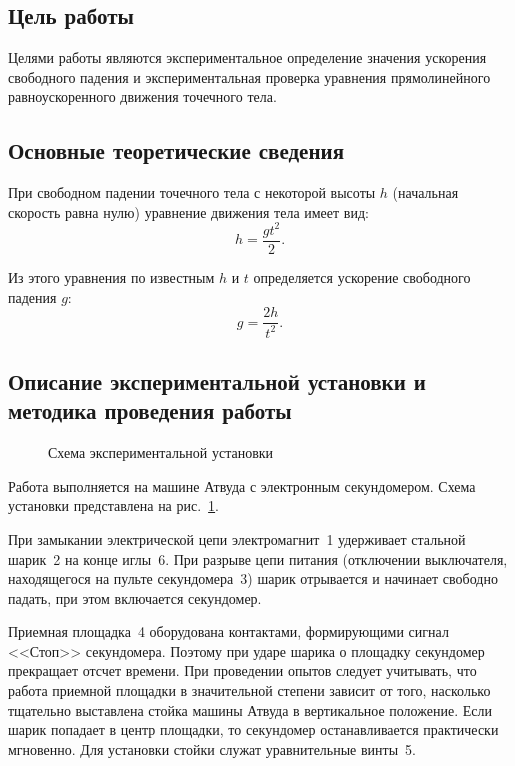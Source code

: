 \documentclass[a4paper, 12pt]{extarticle}
\begin{document}
\MTDTitlePage
\MTDInfoPage

\setcounter{section}{1}

\subsection{Цель работы}
Целями работы являются экспериментальное определение значения ускорения свободного падения и экспериментальная проверка уравнения прямолинейного равноускоренного движения точечного тела. 

\subsection{Основные теоретические сведения}
При свободном падении точечного тела с некоторой высоты $h$ (начальная скорость равна нулю) уравнение движения тела имеет вид: %
\begin{equation}
\label{eq:m1-free-fall-h}
h = \frac{gt^2}{2}.
\end{equation}

Из этого уравнения по известным $h$ и $t$ определяется ускорение свободного падения $g$: %
\begin{equation}
\label{eq:m1-free-fall-g}
g = \frac{2h}{t^2}.
\end{equation}

\subsection{Описание экспериментальной установки и методика проведения работы}
\begin{figure}[h] %
\caption{Схема экспериментальной установки \label{fig:m1-atwood-machine}}
\end{figure}
Работа выполняется на машине Атвуда с электронным секундомером. Схема установки представлена на рис.~\ref{fig:m1-atwood-machine}.

При замыкании электрической цепи электромагнит~1 удерживает стальной шарик~2 на конце иглы~6. При разрыве цепи питания (отключении выключателя, находящегося на пульте секундомера~3) шарик отрывается и начинает свободно падать, при этом включается секундомер. %

Приемная площадка~4 оборудована контактами, формирующими сигнал <<Стоп>> секундомера. Поэтому при ударе шарика о площадку секундомер прекращает отсчет времени. При проведении опытов следует учитывать, что работа приемной площадки в значительной степени зависит от того, насколько тщательно выставлена стойка машины Атвуда в вертикальное положение. Если шарик попадает в центр площадки, то секундомер останавливается практически мгновенно. Для установки стойки служат уравнительные винты~5. %
\end{document}
